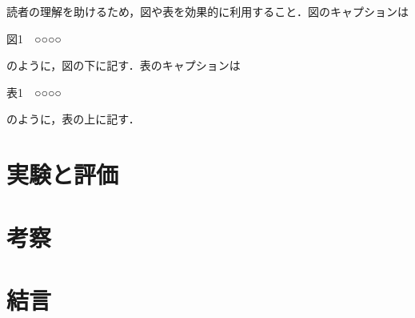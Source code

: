 \documentclass[11pt,a4paper,draft]{jarticle}
\begin{document}
読者の理解を助けるため，図や表を効果的に利用すること．図のキャプションは

\begin{center}図1　○○○○\end{center}

のように，図の下に記す．表のキャプションは

\begin{center}表1　○○○○\end{center}

のように，表の上に記す．

\section{実験と評価}

\section{考察}

\section{結言}

\printbibliography[title=参考文献]
\end{document}
